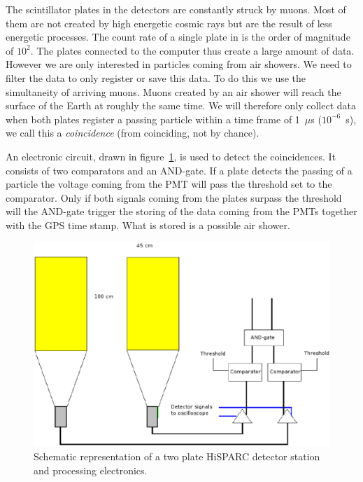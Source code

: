 \documentclass[12pt,a4paper]{article}
\numberwithin{equation}{section}
\numberwithin{figure}{section}
\numberwithin{table}{section}
\begin{document}
The scintillator plates in the detectors are constantly struck by muons. Most of them are not created by high energetic cosmic rays but are the result of less energetic processes. The count rate of a single plate in is the order of magnitude of $10^2$. The plates connected to the computer thus create a large amount of data. However we are only interested in particles coming from air showers. We need to filter the data to only register or save this data. To do this we use the simultaneity of arriving muons. Muons created by an air shower will reach the surface of the Earth at roughly the same time. We will therefore only collect data when both plates register a passing particle within a time frame of 1~$\mu$s ($10^{-6}$~s), we call this a \emph{coincidence} (from coinciding, not by chance). 

An electronic circuit, drawn in figure~\ref{fig:station_schematic}, is used to detect the coincidences. It consists of two comparators and an AND-gate. If a plate detects the passing of a particle the voltage coming from the PMT will pass the threshold set to the comparator. Only if both signals coming from the plates surpass the threshold will the AND-gate trigger the storing of the data coming from the PMTs together with the GPS time stamp. What is stored is a possible air shower. 

\begin{figure}\begin{center}
\includegraphics[scale=0.65]{station_schematic.eps}%
\caption{Schematic representation of a two plate HiSPARC detector station and processing electronics. }\label{fig:station_schematic}
\end{center}\end{figure}
\end{document}
